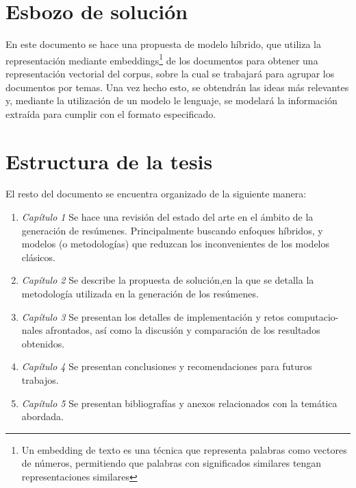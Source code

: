\section{Esbozo de solución}
    En este documento se hace una propuesta de modelo híbrido, que utiliza la representación mediante embeddings\footnote{Un embedding de texto es una técnica que representa palabras como vectores de números, permitiendo que palabras con significados similares tengan representaciones similares}
    de los documentos para obtener una representación vectorial del corpus, sobre la cual se trabajará para agrupar los documentos por temas. Una vez hecho esto, se obtendrán las ideas más relevantes y, mediante la utilización de un modelo le lenguaje, se modelará la información extraída para cumplir con el formato especificado.

\section{Estructura de la tesis}
        El resto del documento se encuentra organizado de la siguiente manera:

        \begin{enumerate}
            \item \emph{Capítulo 1} Se hace una revisión del estado del arte en el ámbito de la generación de resúmenes. Principalmente buscando enfoques híbridos, y modelos (o metodologías) que reduzcan los inconvenientes de los modelos clásicos.
            \item \emph{Capítulo 2} Se describe la propuesta de solución,en la que se detalla la metodología utilizada en la generación de los resúmenes.
            \item \emph{Capítulo 3} Se presentan los detalles de implementación y retos computacio-
            nales afrontados, así como la discusión y comparación de los resultados obtenidos.
            \item \emph{Capítulo 4} Se presentan conclusiones y recomendaciones para futuros trabajos.
            \item \emph{Capítulo 5} Se presentan bibliografías y anexos relacionados con la temática abordada.
        \end{enumerate}


